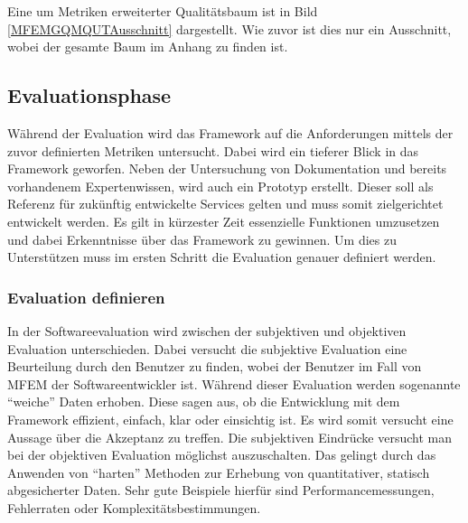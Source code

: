 Eine um Metriken erweiterter Qualitätsbaum ist in Bild \ref{MFEMGQMQUTAusschnitt} dargestellt. Wie zuvor ist dies nur ein Ausschnitt, wobei der gesamte Baum im Anhang zu finden ist.


\subsection{Evaluationsphase}


Während der Evaluation wird das Framework auf die Anforderungen mittels der zuvor definierten Metriken untersucht. Dabei wird ein tieferer Blick in das Framework geworfen. Neben der Untersuchung von Dokumentation und bereits vorhandenem Expertenwissen, wird auch ein Prototyp erstellt. Dieser soll als Referenz für zukünftig entwickelte Services gelten und muss somit zielgerichtet entwickelt werden. Es gilt in kürzester Zeit essenzielle Funktionen umzusetzen und dabei Erkenntnisse über das Framework zu gewinnen. Um dies zu Unterstützen muss im ersten Schritt die Evaluation genauer definiert werden.

\subsubsection{Evaluation definieren}\label{Evaluation_definieren}

In der Softwareevaluation wird zwischen der subjektiven und objektiven Evaluation unterschieden\cite{Hegner2016}.
Dabei versucht die subjektive Evaluation eine Beurteilung durch den Benutzer zu finden, wobei der Benutzer im Fall von \ac{MFEM} der Softwareentwickler ist. Während dieser Evaluation werden sogenannte \enquote{weiche} Daten erhoben. Diese sagen aus, ob die Entwicklung mit dem Framework effizient, einfach, klar oder einsichtig ist. Es wird somit versucht eine Aussage über die Akzeptanz zu treffen.
Die subjektiven Eindrücke versucht man bei der objektiven Evaluation möglichst auszuschalten. Das gelingt durch das Anwenden von \enquote{harten} Methoden zur Erhebung von quantitativer, statisch abgesicherter Daten\cite{Hegner2016}. Sehr gute Beispiele hierfür sind Performancemessungen, Fehlerraten oder Komplexitätsbestimmungen.  

